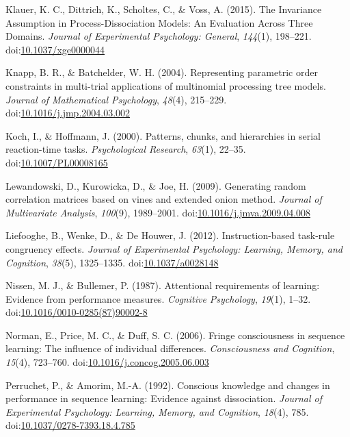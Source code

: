 \documentclass[man]{apa6}
\theoremstyle{definition}
\theoremstyle{definition}
\theoremstyle{definition}
\theoremstyle{remark}
\begin{document}
\hypertarget{ref-klauer_invariance_2015}{}
Klauer, K. C., Dittrich, K., Scholtes, C., \& Voss, A. (2015). The
Invariance Assumption in Process-Dissociation Models: An Evaluation
Across Three Domains. \emph{Journal of Experimental Psychology:
General}, \emph{144}(1), 198--221.
doi:\href{https://doi.org/10.1037/xge0000044}{10.1037/xge0000044}

\hypertarget{ref-knapp_representing_2004}{}
Knapp, B. R., \& Batchelder, W. H. (2004). Representing parametric order
constraints in multi-trial applications of multinomial processing tree
models. \emph{Journal of Mathematical Psychology}, \emph{48}(4),
215--229.
doi:\href{https://doi.org/10.1016/j.jmp.2004.03.002}{10.1016/j.jmp.2004.03.002}

\hypertarget{ref-koch_patterns_2000}{}
Koch, I., \& Hoffmann, J. (2000). Patterns, chunks, and hierarchies in
serial reaction-time tasks. \emph{Psychological Research}, \emph{63}(1),
22--35.
doi:\href{https://doi.org/10.1007/PL00008165}{10.1007/PL00008165}

\hypertarget{ref-lewandowski_generating_2009}{}
Lewandowski, D., Kurowicka, D., \& Joe, H. (2009). Generating random
correlation matrices based on vines and extended onion method.
\emph{Journal of Multivariate Analysis}, \emph{100}(9), 1989--2001.
doi:\href{https://doi.org/10.1016/j.jmva.2009.04.008}{10.1016/j.jmva.2009.04.008}

\hypertarget{ref-liefooghe_instruction-based_2012}{}
Liefooghe, B., Wenke, D., \& De Houwer, J. (2012). Instruction-based
task-rule congruency effects. \emph{Journal of Experimental Psychology:
Learning, Memory, and Cognition}, \emph{38}(5), 1325--1335.
doi:\href{https://doi.org/10.1037/a0028148}{10.1037/a0028148}

\hypertarget{ref-nissen_attentional_1987}{}
Nissen, M. J., \& Bullemer, P. (1987). Attentional requirements of
learning: Evidence from performance measures. \emph{Cognitive
Psychology}, \emph{19}(1), 1--32.
doi:\href{https://doi.org/10.1016/0010-0285(87)90002-8}{10.1016/0010-0285(87)90002-8}

\hypertarget{ref-norman_fringe_2006}{}
Norman, E., Price, M. C., \& Duff, S. C. (2006). Fringe consciousness in
sequence learning: The influence of individual differences.
\emph{Consciousness and Cognition}, \emph{15}(4), 723--760.
doi:\href{https://doi.org/10.1016/j.concog.2005.06.003}{10.1016/j.concog.2005.06.003}

\hypertarget{ref-perruchet_conscious_1992}{}
Perruchet, P., \& Amorim, M.-A. (1992). Conscious knowledge and changes
in performance in sequence learning: Evidence against dissociation.
\emph{Journal of Experimental Psychology: Learning, Memory, and
Cognition}, \emph{18}(4), 785.
doi:\href{https://doi.org/10.1037/0278-7393.18.4.785}{10.1037/0278-7393.18.4.785}
\end{document}
